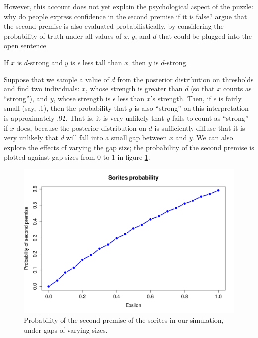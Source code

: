 \documentclass[pdfextras]{handbook}
\begin{document}
However, this account does not yet explain the psychological aspect of the puzzle: why do people express confidence in the second premise if it is false? 
\citet{lassitergoodman13} argue that the second premise is also evaluated probabilistically, by considering the probability of truth under all values of $x$, $y$, and $d$ that could be plugged into the open sentence 
\begin{center}
If $x$ is $d$-strong and $y$ is $\epsilon$ less tall than $x$, then $y$ is $d$-strong.
\end{center}
Suppose that we sample a value of $d$ from the posterior distribution on thresholds and find two individuals: $x$, whose strength is greater than $d$ (so that $x$ counts as ``strong''), and $y$, whose strength is $\epsilon$ less than $x$'s strength. 
Then, if $\epsilon$ is fairly small (say, .1), then the probability that $y$ is also ``strong'' on this interpretation is approximately .92. 
That is, it is very unlikely that $y$ fails to count as ``strong'' if $x$ does, because the posterior distribution on $d$ is sufficiently diffuse that it is very unlikely that $d$ will fall into a small gap between $x$ and $y$.
We can also explore the effects of varying the gap size; the probability of the second premise is plotted against gap sizes from 0 to 1 in figure \ref{sorites}.
 \begin{figure}[tbh]
\begin{center}
\includegraphics[scale=.4]{sorites-prob.pdf}
\end{center}
\label{sorites}
\caption{Probability of the second premise of the sorites in our simulation, under gaps of varying sizes.}
\end{figure}
\end{document}
